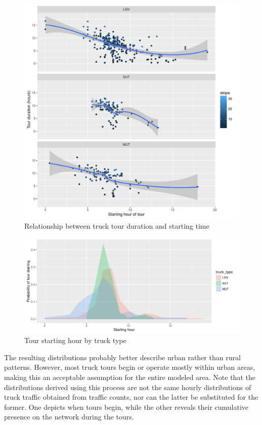 \begin{figure}
\centering
\includegraphics[scale=0.65]{ct/tours-temporal-distribution1.pdf}
\caption{Relationship between truck tour duration and starting time}
\label{fig:ct-temporal-points}
\end{figure}

\begin{figure}
\centering
\includegraphics[scale=0.65]{ct/tours-temporal-distribution2.pdf}
\caption{Tour starting hour by truck type}
\label{fig:ct-temporal-distributions}
\end{figure}

The resulting distributions probably better describe urban rather than rural patterns. However, most truck tours begin or operate mostly within urban areas, making this an acceptable assumption for the entire modeled area. Note that the distributions derived using this process are not the same hourly distributions of truck traffic obtained from traffic counts, nor can the latter be substituted for the former. One depicts when tours begin, while the other reveals their cumulative presence on the network during the tours. 

